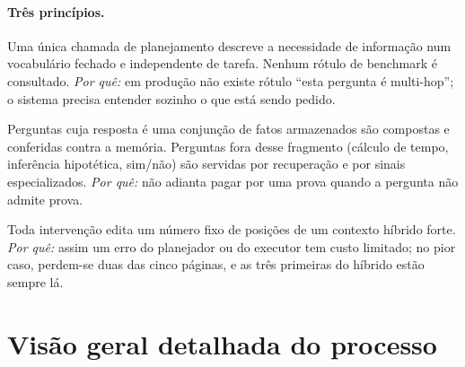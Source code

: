 \documentclass[11pt]{article}
\begin{document}
\paragraph{Três princípios.}
\begin{description}[leftmargin=1.2em, style=nextline]
\item[(P1) Planejar antes de buscar.] Uma única chamada de planejamento
descreve a necessidade de informação num vocabulário fechado e independente
de tarefa. Nenhum rótulo de benchmark é consultado. \emph{Por quê:} em
produção não existe rótulo ``esta pergunta é multi-hop''; o sistema precisa
entender sozinho o que está sendo pedido.
\item[(P2) Certificar o que pode ser certificado.] Perguntas cuja resposta é
uma conjunção de fatos armazenados são compostas e conferidas contra a
memória. Perguntas fora desse fragmento (cálculo de tempo, inferência
hipotética, sim/não) são servidas por recuperação e por sinais
especializados. \emph{Por quê:} não adianta pagar por uma prova quando a
pergunta não admite prova.
\item[(P3) Intervir com limites.] Toda intervenção edita um número fixo de
posições de um contexto híbrido forte. \emph{Por quê:} assim um erro do
planejador ou do executor tem custo limitado; no pior caso, perdem-se duas
das cinco páginas, e as três primeiras do híbrido estão sempre lá.
\end{description}

\section{Visão geral detalhada do processo}\label{sec:visao}
\end{document}

